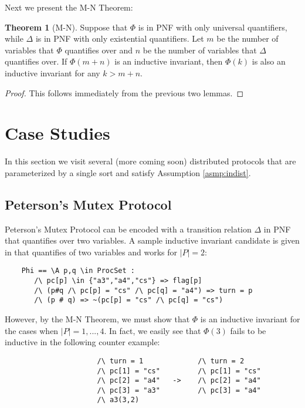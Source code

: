 \documentclass[12pt]{article}
\theoremstyle{definition}
\newtheorem{theorem}{Theorem}
\theoremstyle{remark}
\begin{document}
Next we present the M-N Theorem:

\begin{theorem}[M-N]
  Suppose that $\Phi$ is in PNF with only universal quantifiers, while $\Delta$ is in PNF with only existential quantifiers.  Let $m$ be the number of variables that $\Phi$ quantifies over and $n$ be the number of variables that $\Delta$ quantifies over.  If $\Phi(m+n)$ is an inductive invariant, then $\Phi(k)$ is also an inductive invariant for any $k>m+n$.
\end{theorem}
\begin{proof}
  This follows immediately from the previous two lemmas.
\end{proof}



\section{Case Studies}
In this section we visit several (more coming soon) distributed protocols that are parameterized by a single sort and satisfy Assumption \ref{asmp:indist}.

\subsection{Peterson's Mutex Protocol}
Peterson's Mutex Protocol can be encoded with a transition relation $\Delta$ in PNF that quantifies over two variables.  A sample inductive invariant candidate is given in \cite{ian-peterson} that quantifies of two variables and works for $|P|=2$:
\begin{verbatim}
    Phi == \A p,q \in ProcSet :
       /\ pc[p] \in {"a3","a4","cs"} => flag[p]
       /\ (p#q /\ pc[p] = "cs" /\ pc[q] = "a4") => turn = p
       /\ (p # q) => ~(pc[p] = "cs" /\ pc[q] = "cs")
\end{verbatim}
However, by the M-N Theorem, we must show that $\Phi$ is an inductive invariant for the cases when $|P|=1,...,4$.  In fact, we easily see that $\Phi(3)$ fails to be inductive in the following counter example:
\begin{verbatim}
                      /\ turn = 1             /\ turn = 2
                      /\ pc[1] = "cs"         /\ pc[1] = "cs"
                      /\ pc[2] = "a4"   ->    /\ pc[2] = "a4"
                      /\ pc[3] = "a3"         /\ pc[3] = "a4"
                      /\ a3(3,2)
\end{verbatim}




\end{document}
